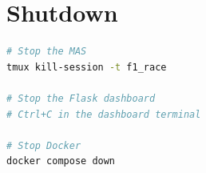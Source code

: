 \section{Shutdown}

\begin{minipage}{\linewidth}
\begin{lstlisting}[language=bash, numbers=none]
# Stop the MAS
tmux kill-session -t f1_race

# Stop the Flask dashboard
# Ctrl+C in the dashboard terminal

# Stop Docker
docker compose down
\end{lstlisting}
\end{minipage}
